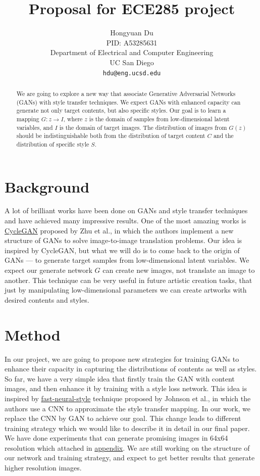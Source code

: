 \documentclass{article}
\title{Proposal for ECE285 project}
\author{
  Hongyuan Du \\
  PID: A53285631\\
  Department of Electrical and Computer Engineering\\
  UC San Diego\\
  \texttt{hdu@eng.ucsd.edu} \\
}
\begin{document}

\maketitle

\begin{abstract}
We are going to explore a new way that associate Generative Adversarial Networks (GANs) with style transfer techniques. We expect GANs with enhanced capacity can generate not only target contents, but also specific styles. Our goal is to learn a mapping $G: z \to I$, where $z$ is the domain of samples from low-dimensional latent variables, and $I$ is the domain of target images. The distribution of images from $G(z)$ should be indistinguishable both from the distribution of target content $C$ and the distribution of specific style $S$.
\end{abstract}

\section{Background}

A lot of brilliant works have been done on GANs and style transfer techniques and have achieved many impressive results. One of the most amazing works is \href{https://arxiv.org/pdf/1703.10593.pdf}{CycleGAN} proposed by Zhu et al., in which the authors implement a new structure of GANs to solve image-to-image translation problems. Our idea is inspired by CycleGAN, but what we will do is to come back to the origin of GANs --- to generate target samples from low-dimensional latent variables. We expect our generate network $G$ can create new images, not translate an image to another. This technique can be very useful in future artistic creation tasks, that just by manipulating low-dimensional parameters we can create artworks with desired contents and styles.

\section{Method}

In our project, we are going to propose new strategies for training GANs to enhance their capacity in capturing the distributions of contents as well as styles. So far, we have a very simple idea that firstly train the GAN with content images, and then enhance it by training with a style loss network. This idea is inspired by \href{https://arxiv.org/pdf/1603.08155.pdf}{fast-neural-style} technique proposed by Johnson et al., in which the authors use a CNN to approximate the style transfer mapping. In our work, we replace the CNN by GAN to achieve our goal. This change leads to different training strategy which we would like to describe it in detail in our final paper. We have done experiments that can generate promising images in 64x64 resolution which attached in \hyperref[ap]{appendix}. We are still working on the structure of our network and training strategy, and expect to get better results that generate higher resolution images.
\end{document}
